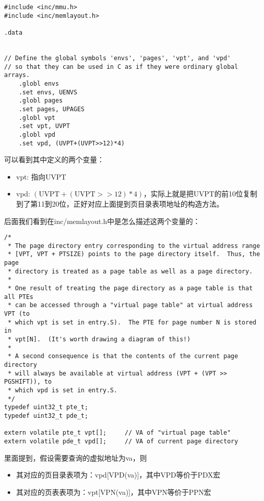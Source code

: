 \documentclass{article}
\begin{document}
\begin{CJK*}{UTF8}{gkai}
\begin{lstlisting}[style=acode, title={\scriptsize \ttfamily \bfseries lib/entry.S}]
#include <inc/mmu.h>
#include <inc/memlayout.h>

.data


// Define the global symbols 'envs', 'pages', 'vpt', and 'vpd'
// so that they can be used in C as if they were ordinary global arrays.
	.globl envs
	.set envs, UENVS
	.globl pages
	.set pages, UPAGES
	.globl vpt
	.set vpt, UVPT
	.globl vpd
	.set vpd, (UVPT+(UVPT>>12)*4)

\end{lstlisting}

可以看到其中定义的两个变量：

\begin{itemize}
\item{vpt: 指向UVPT}
\item{vpd: $(\mathrm{UVPT}+(\mathrm{UVPT}>>12)*4)$}，实际上就是把UVPT的前10位复制到了第11到20位，正好对应上面提到页目录表项地址的构造方法。
\end{itemize}

后面我们看到在inc/memlayout.h中是怎么描述这两个变量的：

\begin{lstlisting}[style=ccode, firstnumber=137, title={\scriptsize \ttfamily \bfseries inc/memlayout.h}]
/*
 * The page directory entry corresponding to the virtual address range
 * [VPT, VPT + PTSIZE) points to the page directory itself.  Thus, the page
 * directory is treated as a page table as well as a page directory.
 *
 * One result of treating the page directory as a page table is that all PTEs
 * can be accessed through a "virtual page table" at virtual address VPT (to
 * which vpt is set in entry.S).  The PTE for page number N is stored in
 * vpt[N].  (It's worth drawing a diagram of this!)
 *
 * A second consequence is that the contents of the current page directory
 * will always be available at virtual address (VPT + (VPT >> PGSHIFT)), to
 * which vpd is set in entry.S.
 */
typedef uint32_t pte_t;
typedef uint32_t pde_t;

extern volatile pte_t vpt[];     // VA of "virtual page table"
extern volatile pde_t vpd[];     // VA of current page directory
\end{lstlisting}

里面提到，假设需要查询的虚拟地址为va，则
\begin{itemize}
\item{其对应的页目录表项为：vpd[VPD(va)]，其中VPD等价于PDX宏}
\item{其对应的页表表项为：vpt[VPN(va)]，其中VPN等价于PPN宏}
\end{itemize}


\end{CJK*}
\end{document}
